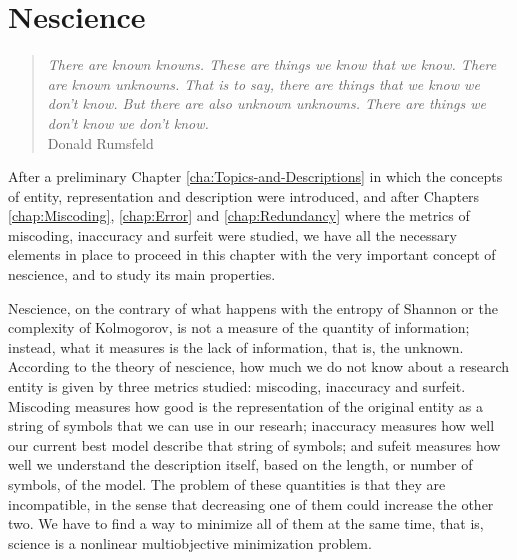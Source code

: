 %
%


%
%


\chapter{Nescience}
\label{chap:Nescience}

\begin{quote}
\begin{flushright}
\emph{There are known knowns. These are things we know that we know.
There are known unknowns. That is to say, there are things that we know we don't know.
But there are also unknown unknowns. There are things we don't know we don't know.} \\
Donald Rumsfeld
\end{flushright}
\end{quote}
\bigskip

After a preliminary Chapter \ref{cha:Topics-and-Descriptions} in which the concepts of entity, representation and description were introduced, and after Chapters \ref{chap:Miscoding}, \ref{chap:Error} and \ref{chap:Redundancy} where the metrics of miscoding, inaccuracy and surfeit were studied, we have all the necessary elements in place to proceed in this chapter with the very important concept of nescience, and to study its main properties.

Nescience, on the contrary of what happens with the entropy of Shannon or the complexity of Kolmogorov, is not a measure of the quantity of information; instead, what it measures is the lack of information, that is, the unknown. According to the theory of nescience, how much we do not know about a research entity is given by three metrics studied: miscoding, inaccuracy and surfeit. Miscoding measures how good is the representation of the original entity as a string of symbols that we can use in our researh; inaccuracy measures how well our current best model describe that string of symbols; and sufeit measures how well we understand the description itself, based on the length, or number of symbols, of the model. The problem of these quantities is that they are incompatible, in the sense that decreasing one of them could increase the other two. We have to find a way to minimize all of them at the same time, that is, science is a nonlinear multiobjective minimization problem.

